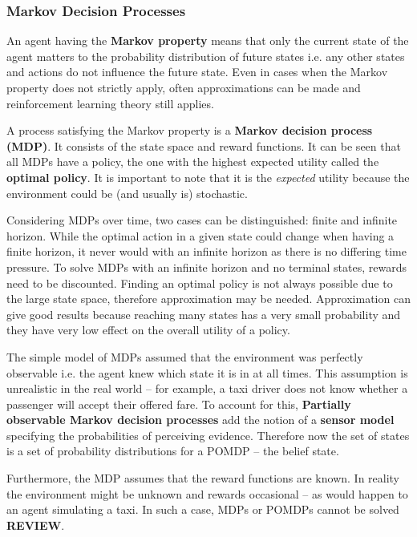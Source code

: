 \subsubsection{Markov Decision Processes}

An agent having the \textbf{Markov property} means that only the current state
of the agent matters to the probability distribution of future states i.e. any
other states and actions do not influence the future state. Even in cases when
the Markov property does not strictly apply, often approximations can be made
and reinforcement learning theory still applies.
\parencite{Sutton1998ai+reinforcement}

A process satisfying the Markov property is a
\textbf{Markov decision process (MDP)}. It consists of the state space and
reward functions. It can be seen that all MDPs have a policy, the one with the
highest expected utility called the \textbf{optimal policy}. It is important to
note that it is the \textit{expected} utility because the environment could be
(and usually is) stochastic. \parencite{Russell2010ai+modern}

Considering MDPs over time, two cases can be distinguished: finite and infinite
horizon. While the optimal action in a given state could change when having a
finite horizon, it never would with an infinite horizon as there is no
differing time pressure. To solve MDPs with an infinite horizon and no terminal
states, rewards need to be discounted. Finding an optimal policy is not always
possible due to the large state space, therefore approximation may be needed.
Approximation can give good results because reaching many states has a very
small probability and they have very low effect on the overall utility of a
policy. \parencite{Russell2010ai+modern}

The simple model of MDPs assumed that the environment was perfectly observable
i.e. the agent knew which state it is in at all times. This assumption is
unrealistic in the real world -- for example, a taxi driver does not know
whether a passenger will accept their offered fare. To account for this,
\textbf{Partially observable Markov decision processes} add the notion of a
\textbf{sensor model} specifying the probabilities of perceiving evidence.
Therefore now the set of states is a set of probability distributions for a
POMDP -- the belief state. \parencite{Russell2010ai+modern}

Furthermore, the MDP assumes that the reward functions are known. In reality
the environment might be unknown and rewards occasional -- as would happen to
an agent simulating a taxi. In such a case, MDPs or POMDPs cannot be solved
\textbf{REVIEW}.

